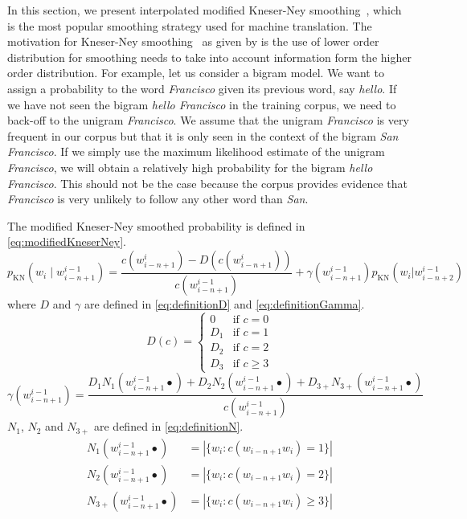 In this section, we present interpolated modified Kneser-Ney
smoothing~\citep{chen-goodman:1998:harvard}, which is the most popular smoothing
strategy used for machine translation. The motivation for Kneser-Ney
smoothing~\citep{kneser-ney:1995:ICASSP} as given by
\citet{chen-goodman:1998:harvard} is the use of lower order distribution for
smoothing needs to take into account information form the higher order
distribution. For example, let us consider a bigram model. We want to assign a
probability to the word \emph{Francisco} given its previous word, say
\emph{hello}. If we have not seen the bigram \emph{hello Francisco} in the
training corpus, we need to back-off to the unigram \emph{Francisco}. We assume
that the unigram \emph{Francisco} is very frequent in our corpus but that it
is only seen in the context of the bigram \emph{San Francisco}. If we simply
use the maximum likelihood estimate of the unigram \emph{Francisco}, we will
obtain a relatively high probability for the bigram \emph{hello Francisco}. This
should not be the case because the corpus provides evidence that
\emph{Francisco} is very unlikely to follow any other word than \emph{San}.

The modified Kneser-Ney smoothed probability is defined in
\autoref{eq:modifiedKneserNey}.
%
\begin{equation}
  p_{\text{KN}}(w_i \mid w_{i - n + 1}^{i - 1}) = \frac{c(w_{i - n + 1}^i) - D(c(w_{i - n + 1}^i))}{c(w_{i - n + 1}^{i - 1})} + \gamma(w_{i - n + 1}^{i - 1}) p_{\text{KN}}(w_i | w_{i - n + 2}^{i - 1})
  \label{eq:modifiedKneserNey}
\end{equation}
%
where $D$ and $\gamma$ are defined in \autoref{eq:definitionD} and
\autoref{eq:definitionGamma}.
%
\begin{equation}
  D(c) =
  \begin{cases}
    0 & \text{if } c = 0 \\
    D_1 & \text{if } c = 1 \\
    D_2 & \text{if } c = 2 \\
    D_3 & \text{if } c \geq 3
  \end{cases}
  \label{eq:definitionD}
\end{equation}
%
\begin{equation}
  \gamma(w_{i - n + 1}^{i - 1}) = \frac{D_1 N_1(w_{i - n + 1}^{i - 1} \bullet) + D_2 N_2(w_{i - n + 1}^{i - 1} \bullet) + D_{3+} N_{3+}(w_{i - n + 1}^{i - 1} \bullet)}{c(w_{i - n + 1}^{i - 1})}
  \label{eq:definitionGamma}
\end{equation}
%
$N_1$, $N_2$ and $N_{3+}$ are defined in \autoref{eq:definitionN}.
%
\begin{equation}
  \begin{split}
    N_1(w_{i - n + 1}^{i - 1} \bullet) &= |\{w_i: c(w_{i - n + 1} w_i) = 1 \}| \\
    N_2(w_{i - n + 1}^{i - 1} \bullet) &= |\{w_i: c(w_{i - n + 1} w_i) = 2 \}| \\
    N_{3+}(w_{i - n + 1}^{i - 1} \bullet) &= |\{w_i: c(w_{i - n + 1} w_i) \geq 3 \}|
  \end{split}
  \label{eq:definitionN}
\end{equation}

